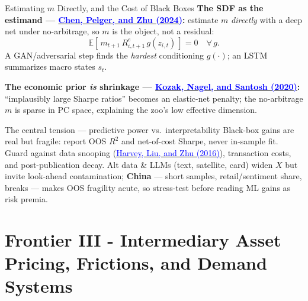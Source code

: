 \documentclass{beamer}
\newcommand{\E}{\mathbb{E}}
\begin{document}
\begin{frame}{Estimating \texorpdfstring{$m$}{m} Directly, and the Cost of Black Boxes}
\small
\textbf{The SDF as the estimand --- \href{https://doi.org/10.1287/mnsc.2023.4695}{\textcolor{blue}{Chen, Pelger, and Zhu (2024)}}:} estimate $m$ \emph{directly} with a deep net under no-arbitrage, so $m$ is the object, not a residual:
\begin{equation*}
  \E\!\left[\, m_{t+1}\, R^e_{i,t+1}\, g(z_{i,t})\,\right] = 0 \quad \forall\, g .
\end{equation*}
A \alert{GAN}/adversarial step finds the \emph{hardest} conditioning $g(\cdot)$; an LSTM summarizes macro states $s_t$.

\textbf{The economic prior \emph{is} shrinkage --- \href{https://doi.org/10.1016/j.jfineco.2019.06.008}{\textcolor{blue}{Kozak, Nagel, and Santosh (2020)}}:} ``implausibly large Sharpe ratios'' becomes an elastic-net penalty; the no-arbitrage $m$ is \alert{sparse in PC space}, explaining the zoo's low effective dimension.
\begin{block}{The central tension --- predictive power vs.\ interpretability}
Black-box gains are real but fragile: report \alert{OOS $R^2$ and net-of-cost Sharpe}, never in-sample fit. Guard against data snooping (\href{https://doi.org/10.1093/rfs/hhv059}{\textcolor{blue}{Harvey, Liu, and Zhu (2016)}}), transaction costs, and post-publication decay. \alert{Alt data \& LLMs} (text, satellite, card) widen $X$ but invite look-ahead contamination; \textbf{China} --- short samples, retail/sentiment share, breaks --- makes OOS fragility acute, so stress-test before reading ML gains as risk premia.
\end{block}
\end{frame}

\section{Frontier III - Intermediary Asset Pricing, Frictions, and Demand Systems}
\end{document}

